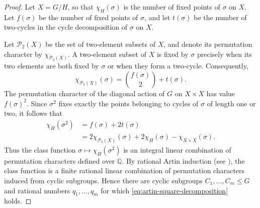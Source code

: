 \documentclass[twoside,reqno,11pt,a4paper]{amsart}
\numberwithin{equation}{section}
\theoremstyle{plain}
\theoremstyle{definition}
\theoremstyle{remark}
\renewcommand{\le}{\leqslant}
\begin{document}
\begin{proof}
Let $X = G/H$, so that $\chi_H(\sigma)$ is the number of fixed
points of $\sigma$ on $X$.  Let $f(\sigma)$ be the number of fixed
points of $\sigma$, and let $t(\sigma)$ be the number of two-cycles
in the cycle decomposition of $\sigma$ on $X$.

Let $\mathcal P_2(X)$ be the set of two-element subsets of $X$, and
denote its permutation character by $\chi_{\mathcal P_2(X)}$.  A
two-element subset of $X$ is fixed by $\sigma$ precisely when its two
elements are both fixed by $\sigma$ or when they form a two-cycle.
Consequently,
\begin{equation*}
\chi_{\mathcal P_2(X)}(\sigma)
=\binom{f(\sigma)}{2}+t(\sigma).
\end{equation*}
The permutation character of the diagonal action of $G$ on $X\times X$
has value $f(\sigma)^2$.  Since $\sigma^2$ fixes exactly the points
belonging to cycles of $\sigma$ of length one or two, it follows that
\begin{equation*}
\begin{split}
\chi_H(\sigma^2)
&=f(\sigma)+2t(\sigma)\\
&=2\chi_{\mathcal P_2(X)}(\sigma)
  +2\chi_H(\sigma)-\chi_{X\times X}(\sigma).
\end{split}
\end{equation*}
Thus the class function $\sigma\mapsto\chi_H(\sigma^2)$ is an integral
linear combination of permutation characters defined over $\mathbb Q$.
By rational Artin induction (see \cite[Chapter 13, Section 1, Theorem 30]{Serre}), the class function is a finite rational linear combination of permutation characters induced from cyclic subgroups.  Hence there are cyclic subgroups
$C_1,\ldots,C_m\le G$ and rational numbers $q_1,\ldots,q_m$ for which
\eqref{eq:artin-square-decomposition} holds.


\end{proof}
\end{document}
